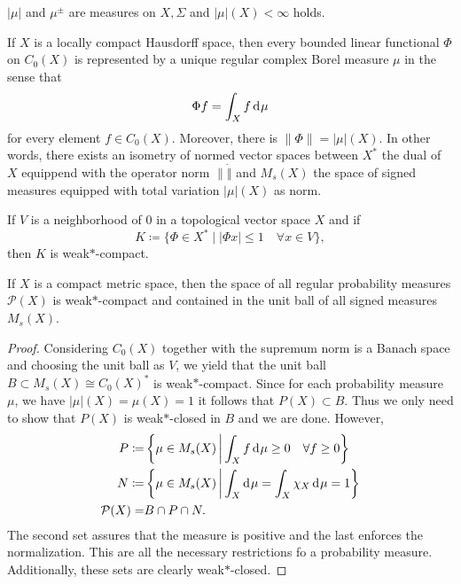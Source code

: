 \begin{prop}
  \(|\mu|\) and \(\mu^\pm\) are measures on \(X, \Sigma\) and \(|\mu|(X) < \infty\) holds.
\end{prop}

\begin{thm}
  If \(X\) is a locally compact Hausdorff space, then every bounded linear functional \(\Phi\) on \(C_0(X)\) is represented by a unique regular complex Borel measure \(\mu\) in the sense that \[
    \Phi f = \int_X f \d\mu
  \]
  for every element \(f \in C_0(X)\). Moreover, there is \(\|\Phi\| = |\mu|(X)\). In other words, there exists an isometry of normed vector spaces between \(X^\ast\) the dual of \(X\) equippend with the operator norm \(\|\dot \|\) and \(M_{s}(X)\) the space of signed measures equipped with total variation \(|\mu|(X)\) as norm.
\end{thm}

\begin{thm}
  If \(V\) is a neighborhood of 0 in a topological vector space \(X\) and if
  \[
    K \coloneqq \{ \Phi \in X^\ast \mid |\Phi x| \leq 1 \quad \forall x \in V\},
  \]
  then \(K\) is weak\(\ast\)-compact.
\end{thm}

\begin{cor}
  \label{cor:banach-alaoglu}
  If \(X\) is a compact metric space, then the space of all regular probability measures \(\mathcal{P}(X)\) is weak\(\ast\)-compact and contained in the unit ball of all signed measures \(M_{s}(X)\).
\end{cor}

\begin{proof}
  Considering \(C_0(X)\) together with the supremum norm is a Banach space and choosing the unit ball as \(V\), we yield that the unit ball \(B \subset M_s(X) \cong C_0(X)^\ast\) is weak\(\ast\)-compact. Since for each probability measure \(\mu\), we have \(|\mu|(X) = \mu(X) = 1\) it follows that \(P(X) \subset B\). Thus we only need to show that \(P(X)\) is weak\(\ast\)-closed in \(B\) and we are done. However,
  \begin{align*}
    P \coloneqq & \left\{\mu \in M_s(X) \relmid \int_X f \d\mu \geq 0 \quad \forall f \geq 0\right\}\\
    N \coloneqq & \left\{\mu \in M_s(X) \relmid \int_X \d\mu = \int_X \chi_X \d\mu = 1\right\}\\
    \mathcal{P}(X)  = & B \cap P \cap N.
  \end{align*}
  The second set assures that the measure is positive and the last enforces the normalization. This are all the necessary restrictions fo a probability measure. Additionally, these sets are clearly weak\(\ast\)-closed.
\end{proof}

